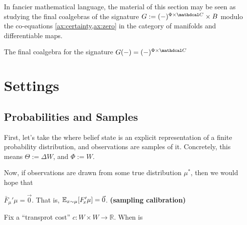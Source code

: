 \documentclass{article}
\def\confdom{\mathdcal C}
\begin{document}
In fancier mathematical language, the material of this section may be seen as studying the final coalgebras of the signature 
$
	G := (-)^{\Phi \times \confdom} \times B
$
modulo the co-equations \cref{ax:certainty,ax:zero} in the category of manifolds and differentiable maps.


\begin{prop}
	The final coalgebra for the signature $G(-) = (-)^{\Phi \times \confdom}$
\end{prop}


\section{Settings}
\subsection{Probabilities and Samples}

First, let's take the where belief state is an explicit representation of a finite probability distribution, and observations are samples of it. 
Concretely, this means $\Theta := \Delta W$, and $\Phi := W$. 

Now, if observations are drawn from some true distribution $\mu^*$, then we would hope that 

\begin{CFaxioms}
	\item  $\bar F_{\!\mu}'\mu = \vec 0$. 
	That is, $\operatorname*{\mathbb{E}}_{x \sim \mu}[ F'_{\!x}\mu] = \vec 0$.
	\hfill \textbf{(sampling calibration)} \label{ax:sample-calibration}
\end{CFaxioms}

\begin{computation}
    Fix a ``transprot cost'' $c : W\times W \to \mathbb R$. 
    When is 
    \tcblower
\end{computation}
\end{document}
